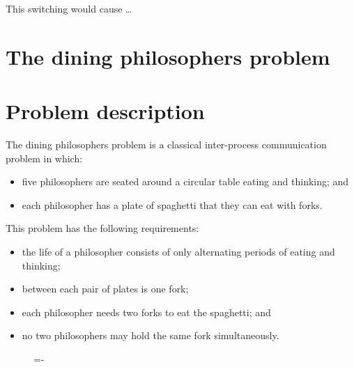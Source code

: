 \documentclass[a4paper]{systems-software}
\begin{document}
This switching would cause …


\section{The dining philosophers problem}

\section*{Problem description}

The dining philosophers problem is a classical inter-process communication problem in which:
\begin{itemize}
	\item five philosophers are seated around a circular table eating and thinking; and
	\item each philosopher has a plate of spaghetti that they can eat with forks.
\end{itemize}

This problem has the following requirements:
\begin{itemize}
	\item the life of a philosopher consists of only alternating periods of eating and thinking;
	\item between each pair of plates is one fork;
	\item each philosopher needs two forks to eat the spaghetti; and
	\item no two philosophers may hold the same fork simultaneously.
\end{itemize}

\begin{figure}[H]
  \lineskip=-\fboxrule
\end{figure}
\end{document}
